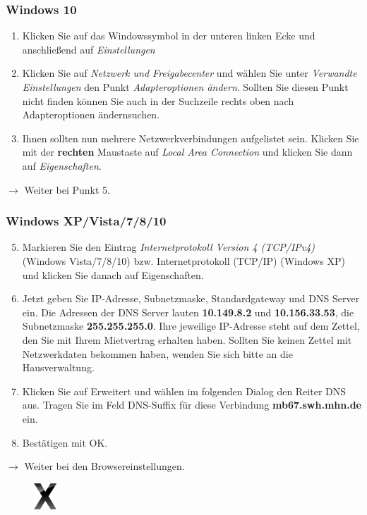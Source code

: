 \documentclass[a4paper,12pt]{scrartcl}
\begin{document}
\subsubsection*{Windows 10}
\begin{enumerate}
	\item Klicken Sie auf das Windowssymbol in der unteren linken Ecke und anschließend auf \emph{Einstellungen}
	\item Klicken Sie auf \textit{Netzwerk und Freigabecenter} und wählen Sie unter \textit{Verwandte Einstellungen} den Punkt \textit{Adapteroptionen ändern}. Sollten Sie diesen Punkt nicht finden können Sie auch in der Suchzeile rechts oben nach \glqq Adapteroptionen ändern\grqq suchen.
    \item Ihnen sollten nun mehrere Netzwerkverbindungen aufgelistet sein. Klicken Sie mit der \textbf{rechten} Maustaste auf \textit{Local Area Connection} und klicken Sie dann auf \textit{Eigenschaften}.
\end{enumerate}
$\rightarrow$ Weiter bei Punkt 5.

\subsubsection*{Windows XP/Vista/7/8/10}
\begin{enumerate}
    \setcounter{enumi}{4}
    \item Markieren Sie den Eintrag \textit{Internetprotokoll Version 4 (TCP/IPv4)} (Windows Vista/7/8/10) bzw. Internetprotokoll  (TCP/IP) (Windows XP) und klicken Sie danach auf Eigenschaften.
	\item Jetzt geben Sie IP-Adresse, Subnetzmaske, Standardgateway und DNS Server ein. Die Adressen der DNS Server lauten \textbf{10.149.8.2} und \textbf{10.156.33.53}, die Subnetzmaske \textbf{255.255.255.0}. Ihre jeweilige IP-Adresse steht auf dem Zettel, den Sie mit Ihrem Mietvertrag erhalten haben. Sollten Sie keinen Zettel mit Netzwerkdaten bekommen haben, wenden Sie sich bitte an die Hausverwaltung.
    \item Klicken Sie auf Erweitert und wählen im folgenden Dialog den Reiter DNS aus. Tragen Sie im Feld DNS-Suffix für diese Verbindung \textbf{mb67.swh.mhn.de} ein.
    \item Bestätigen mit OK.
\end{enumerate}
$\rightarrow$ Weiter bei den Browsereinstellungen.



\pagebreak

\begin{figure}[t!]
    \raggedleft
    \vspace{-20pt}
    \includegraphics[height=1cm,keepaspectratio]{Bilder/OSXLeopard}
    \vspace{-30pt}
\end{figure}
\end{document}
